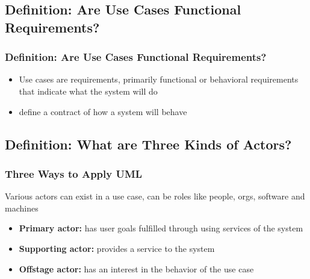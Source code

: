\documentclass{beamer}
\begin{document}
\subsection{Definition: Are Use Cases Functional Requirements?} 
\begin{frame}
	\frametitle{Definition: Are Use Cases Functional Requirements?}
	\begin{itemize}
    \item<+-> Use cases are requirements, primarily functional or behavioral requirements that indicate what
the system will do
    \item<+-> define a contract of how a system will behave
    \end{itemize}
\end{frame}

\subsection{Definition: What are Three Kinds of Actors?}
\begin{frame}
	\frametitle{Three Ways to Apply UML}
	Various actors can exist in a use case, can be roles like people, orgs, software and machines 
	\begin{itemize}
		\item<+-> \textbf{Primary actor:} has user goals fulfilled through using services of the system 
		\item<+-> \textbf{Supporting actor:} provides a service to the system
		\item<+-> \textbf{Offstage actor:} has an interest in the behavior of the use case
    \end{itemize}
\end{frame}
\end{document}
